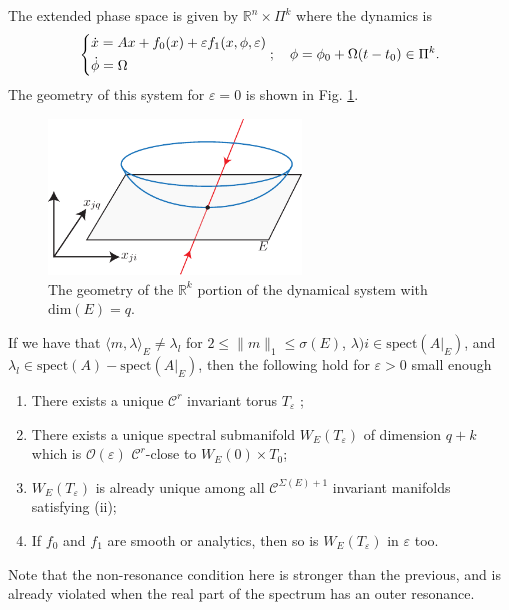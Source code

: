 The extended phase space is given by $\mathbb{R}^{n} \times \Pi^{k}$ where the dynamics is 
\begin{align}
\begin{dcases}
	\dot{x} = Ax + f_0(x) + \varepsilon f_1(x, \phi, \varepsilon) \\
	\dot{\phi} = \Omega 
\end{dcases}
;\quad \phi = \phi_0 + \Omega(t-t_0) \in \Pi^{k}.
\end{align}
The geometry of this system for $\varepsilon=0$ is shown in Fig. \ref{fig:ssm_eps0}.
\begin{figure}[h!]
	\centering
	\includegraphics[width=0.6\textwidth]{figures/ch9/32ssm_ex0.pdf}
	\caption{The geometry of the $\mathbb{R}^{k}$ portion of the dynamical system with $ \textrm{dim} (E) = q$.}
	\label{fig:ssm_eps0}
\end{figure}
\begin{theorem}[]
If we have that $\langle m, \lambda \rangle_E \neq \lambda_l$ for $2 \leq \|m\|_{1} \leq \sigma(E)$, $\lambda)i \in  \textrm{spect} (A|_{E})$, and $\lambda_l \in  \textrm{spect} (A)- \textrm{spect} (A|_{E})$, then the following hold for $\varepsilon >0$ small enough
\begin{enumerate}
	\item There exists a unique $\mathcal{C}^{r}$ invariant torus $T_{\varepsilon}$ ;
	\item There exists a unique spectral submanifold $W_{E}(T_{\varepsilon})$ of dimension $q+k$ which is $\mathcal{O}(\varepsilon)$ $\mathcal{C}^{r}$-close to $W_{E}(0)\times T_0$;
	\item $W_{E}(T_{\varepsilon})$ is already unique among all $\mathcal{C}^{\Sigma(E) + 1}$ invariant manifolds satisfying (ii);
	\item If $f_0$ and $f_1$ are smooth or analytics, then so is $W_{E}(T_\varepsilon)$ in $\varepsilon$ too.
\end{enumerate}
\end{theorem}
\begin{remark}[]
	Note that the non-resonance condition here is stronger than the previous, and is already violated when the real part of the spectrum has an outer resonance.
\end{remark}

